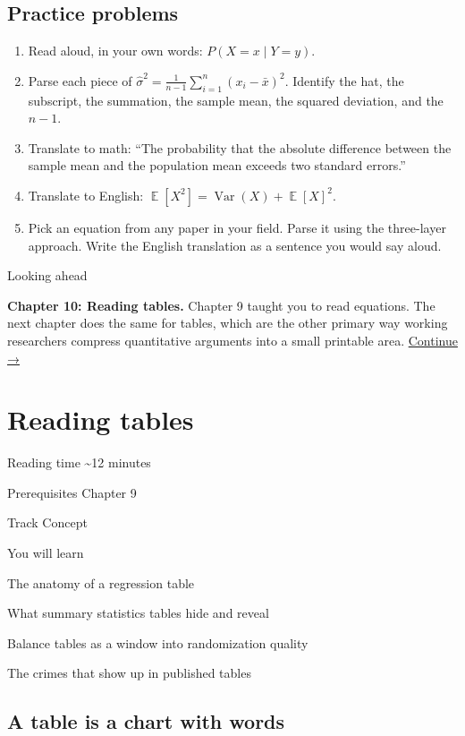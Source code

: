 \documentclass[
  letterpaper,
  11pt,
  twoside,
  openany]{scrbook}
\newcommand{\E}{\operatorname{\mathbb{E}}}
\newcommand{\Var}{\operatorname{Var}}
\begin{document}
\section{Practice problems}\label{practice-problems-8}

\begin{enumerate}
\def\labelenumi{\arabic{enumi}.}
\item
  Read aloud, in your own words: \(P(X = x \mid Y = y)\).
\item
  Parse each piece of
  \(\hat\sigma^2 = \frac{1}{n-1} \sum_{i=1}^n (x_i - \bar{x})^2\).
  Identify the hat, the subscript, the summation, the sample mean, the
  squared deviation, and the \(n-1\).
\item
  Translate to math: ``The probability that the absolute difference
  between the sample mean and the population mean exceeds two standard
  errors.''
\item
  Translate to English: \(\E[X^2] = \Var(X) + \E[X]^2\).
\item
  Pick an equation from any paper in your field. Parse it using the
  three-layer approach. Write the English translation as a sentence you
  would say aloud.
\end{enumerate}

{Looking ahead}

\textbf{Chapter 10: Reading tables.} Chapter 9 taught you to read
equations. The next chapter does the same for tables, which are the
other primary way working researchers compress quantitative arguments
into a small printable area. \href{10-reading-tables.qmd}{Continue →}

\chapter{Reading tables}\label{reading-tables}

{Reading time} {\textasciitilde12 minutes}

{Prerequisites} {Chapter 9}

{Track} {Concept}

{You will learn}

The anatomy of a regression table

What summary statistics tables hide and reveal

Balance tables as a window into randomization quality

The crimes that show up in published tables

\section{A table is a chart with
words}\label{a-table-is-a-chart-with-words}
\end{document}
